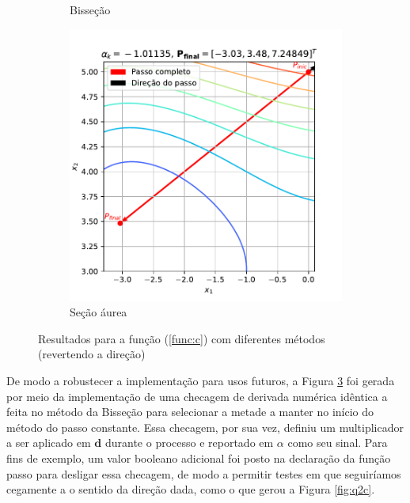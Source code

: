 \documentclass[10pt, a4paper]{article}
\begin{document}
\begin{figure}[htpb]
\begin{subfigure}[b]{0.32\textwidth}
      \caption{Bisseção}
      \label{fig:q2c2_2}
  \end{subfigure}
  \hfill
  \begin{subfigure}[b]{0.32\textwidth}
      \centering
      \includegraphics[width=\textwidth]{images/q2c2_3.pdf}
      \caption{Seção áurea}
      \label{fig:q2c2_3}
  \end{subfigure}
     \caption{Resultados para a função (\ref{func:c}) com diferentes métodos (revertendo a direção)}
     \label{fig:q2c2}
\end{figure}

De modo a robustecer a implementação para usos futuros, a Figura \ref{fig:q2c2} foi gerada por meio
da implementação de uma checagem de derivada numérica idêntica a feita no método da Bisseção para 
selecionar a metade a manter no início do método do passo constante. Essa checagem, por sua vez, definiu
um multiplicador a ser aplicado em $\mathbf{d}$ durante o processo e reportado em $\alpha$ como 
seu sinal. Para fins de exemplo, um valor booleano adicional foi posto na declaração da função passo
para desligar essa checagem, de modo a permitir testes em que seguiríamos cegamente a o sentido da direção dada,
como o que gerou a Figura \ref{fig:q2c}.




\end{document}
